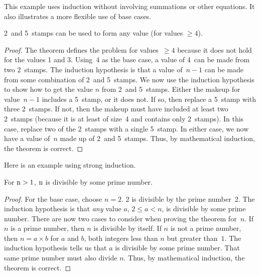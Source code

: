 \begin{example}
This example uses induction without involving summations or other
equations.
It also illustrates a more flexible use of base cases.
\medskip

\begin{theorem}
\label{ThmStamps}
2\textcent\ and 5\textcent\ stamps can be used to form any value
(for values \(\geq 4\)).
\end{theorem}

\begin{proof}
The theorem defines the problem for values~\(\geq 4\)
because it does not hold for the values 1 and 3.
Using~4 as the base case, a value of 4\textcent\ can be made from two
2\textcent\ stamps.
The induction hypothesis is that a value of~\(n-1\) can be
made from some combination of 2\textcent\ and 5\textcent\ stamps.
We now use the induction hypothesis to show how to get the value \(n\)
from 2\textcent\ and 5\textcent\ stamps.
Either the makeup for value~\(n-1\) includes a 5\textcent\ stamp, or
it does not.
If so, then replace a 5\textcent\ stamp with three 2\textcent\ stamps.
If not, then the makeup must have included at least two 2\textcent\
stamps (because it is at least of size~4 and contains only 2\textcent\
stamps).
In this case, replace two of the 2\textcent\ stamps with a single
5\textcent\ stamp.
In either case, we now have a value of~\(n\) made up of
2\textcent\ and 5\textcent\ stamps. 
Thus, by mathematical induction, the theorem is correct.
\end{proof}
\end{example}

\begin{example}
Here is an example using strong induction.
\medskip

\begin{theorem}
For \({\rm n} > 1\), \({\rm n}\) is divisible by some prime number.
\end{theorem}

\begin{proof}
For the base case, choose \(n = 2\).
2 is divisible by the prime number~2.
The induction hypothesis is that \emph{any} value \(a\), \(2 \leq a < n\),
is divisible by some prime number.
There are now two cases to consider when proving the theorem for~\(n\).
If \(n\) is a prime number, then \(n\) is divisible by itself.
If \(n\) is not a prime number, then \mbox{\(n = a \times b\)}
for \(a\) and \(b\), both integers less than \(n\) but greater than~\(1\).
The induction hypothesis tells us that \(a\) is divisible by some
prime number.
That same prime number must also divide \(n\).
Thus, by mathematical induction, the theorem is correct.
\end{proof}
\end{example}

